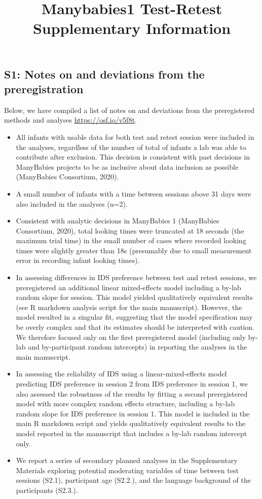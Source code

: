 \documentclass[
  man, donotrepeattitle,floatsintext]{apa6}
\title{Manybabies1 Test-Retest Supplementary Information}
\author{\phantom{0}}
\date{}
\affiliation{\phantom{0}}
\providecommand{\tightlist}{%
  \setlength{\itemsep}{0pt}\setlength{\parskip}{0pt}}
\begin{document}
\maketitle

\hypertarget{s1-notes-on-and-deviations-from-the-preregistration}{%
\subsection{S1: Notes on and deviations from the preregistration}\label{s1-notes-on-and-deviations-from-the-preregistration}}

Below, we have compiled a list of notes on and deviations from the preregistered methods and analyses \url{https://osf.io/v5f8t}.

\begin{itemize}
\tightlist
\item
  All infants with usable data for both test and retest session were included in the analyses, regardless of the number of total of infants a lab was able to contribute after exclusion. This decision is consistent with past decisions in ManyBabies projects to be as inclusive about data inclusion as possible (ManyBabies Consortium, 2020).
\item
  A small number of infants with a time between sessions above 31 days were also included in the analyses (n=2).
\item
  Consistent with analytic decisions in ManyBabies 1 (ManyBabies Consortium, 2020), total looking times were truncated at 18 seconds (the maximum trial time) in the small number of cases where recorded looking times were slightly greater than 18s (presumably due to small measurement error in recording infant looking times).
\item
  In assessing differences in IDS preference between test and retest sessions, we preregistered an additional linear mixed-effects model including a by-lab random slope for session. This model yielded qualitatively equivalent results (see R markdown analysis script for the main manuscript). However, the model resulted in a singular fit, suggesting that the model specification may be overly complex and that its estimates should be interpreted with caution. We therefore focused only on the first preregistered model (including only by-lab and by-participant random intercepts) in reporting the analyses in the main manuscript.
\item
  In assessing the reliability of IDS using a linear-mixed-effects model predicting IDS preference in session 2 from IDS preference in session 1, we also assessed the robustness of the results by fitting a second preregistered model with more complex random effects structure, including a by-lab random slope for IDS preference in session 1. This model is included in the main R markdown script and yields qualitatively equivalent results to the model reported in the manuscript that includes a by-lab random intercept only.
\item
  We report a series of secondary planned analyses in the Supplementary Materials exploring potential moderating variables of time between test sessions (S2.1), participant age (S2.2.), and the language background of the participants (S2.3.).
\end{itemize}
\end{document}
